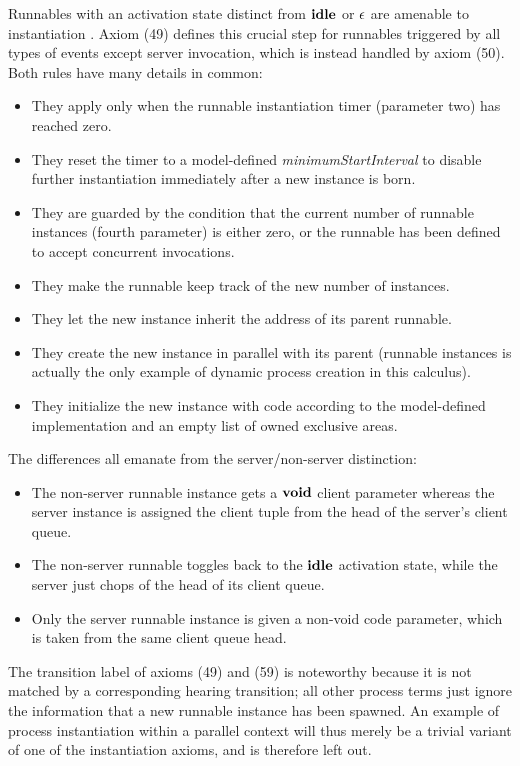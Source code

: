 \documentclass[10pt,conference]{IEEEtran}
\begin{document}
Runnables with an activation state distinct from $\textbf{idle}$ or $\epsilon$ are amenable to instantiation \cite[ch.~4.2.3]{AR:RTE}. Axiom (49) defines this crucial step for runnables triggered by all types of events except server invocation, which is instead handled by axiom (50). Both rules have many details in common:
\begin{itemize}
\item They apply only when the runnable instantiation timer (parameter two) has reached zero.
\item They reset the timer to a model-defined \emph{minimumStartInterval} to disable further instantiation immediately after a new instance is born.
\item They are guarded by the condition that the current number of runnable instances (fourth parameter) is either zero, or the runnable has been defined to accept concurrent invocations.
\item They make the runnable keep track of the new number of instances.
\item They let the new instance inherit the address of its parent runnable.
\item They create the new instance in parallel with its parent (runnable instances is actually the only example of dynamic process creation in this calculus).
\item They initialize the new instance with code according to the model-defined implementation and an empty list of owned exclusive areas.
\end{itemize}
The differences all emanate from the server/non-server distinction:
\begin{itemize}
\item The non-server runnable instance gets a $\textbf{void}$ client parameter whereas the server instance is assigned the client tuple from the head of the server's client queue.
\item The non-server runnable toggles back to the $\textbf{idle}$ activation state, while the server just chops of the head of its client queue.
\item Only the server runnable instance is given a non-void code parameter, which is taken from the same client queue head.
\end{itemize}
The transition label of axioms (49) and (59) is noteworthy because it is not matched by a corresponding hearing transition; all other process terms just ignore the information that a new runnable instance has been spawned. An example of process instantiation within a parallel context will thus merely be a trivial variant of one of the instantiation axioms, and is therefore left out.
\end{document}
